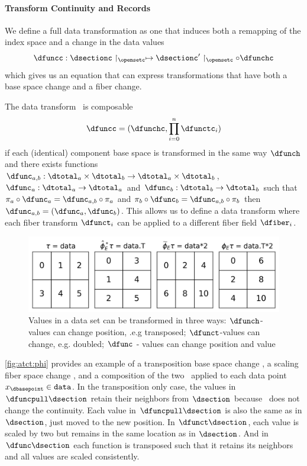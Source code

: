 \documentclass[10pt,journal,compsoc]{IEEEtran}
\theoremstyle{definition}
\theoremstyle{remark}
\begin{document}
\paragraph{Transform Continuity and Records}

We define a full data transformation as one that induces both a remapping of the index space and a change in the data values
\begin{equation}
  \label{eq:atct:morphism:all}
  \dfuncc: \dsectionc\restriction_{\opensetc} \mapsto \dsectionc^{\prime}\restriction_{\opensetc} \circ \dfunchc
\end{equation}
which gives us an equation that can express transformations that have both a base space change and a fiber change. 

The data transform \dfunc\ is composable 
\begin{equation}
  \dfuncc = (\dfunchc, \prod\limits_{i=0}^{n}\dfunctc_i)
\end{equation}
if each (identical) component base space is transformed in the same way $\dfunch$ and there exists functions $\dfunc_{a,b}: \dtotal_a \times \dtotal_b \rightarrow \dtotal_a \times \dtotal_b$, $\dfunc_{a}: \dtotal_a \rightarrow \dtotal_a$ and $\dfunc_{b}: \dtotal_b \rightarrow \dtotal_b$ such that $\pi_a \circ \dfunc_a = \dfunc_{a,b} \circ \pi_a$ and $\pi_b \circ \dfunc_b = \dfunc_{a,b} \circ \pi_b$ then $\dfunc_{a,b} = (\dfunc_a, \dfunc_b)$. This allows us to define a data transform where each fiber transform $\dfunct_{i}$ can be applied to a different fiber field $\dfiber_i$. 

\begin{figure}[h!]
  \includegraphics[width=\columnwidth]{phi.png}
  \caption{Values in a data set can be transformed in three ways: $\dfunch$-values can change position, .e.g transposed;  $\dfunct$-values can change, e.g. doubled; $\dfunc$ - values can change position and value  \label{fig:atct:phi}}
\end{figure}
\autoref{fig:atct:phi} provides an example of a transposition base space change \dfunch, a scaling fiber space change \dfunct, and a composition of the two \dfunc\ applied to each data point $x_{\dbasepoint} \in \texttt{data}$. In the transposition only case, the values in $\dfuncpull\dsection$ retain their neighbors from $\dsection$ because \dfunc\ does not change the continuity. Each value in $\dfuncpull\dsection$ is also the same as in $\dsection$, just moved to the new position. In $\dfunct\dsection$, each value is scaled by two but remains in the same location as in $\dsection$. And in $\dfunc\dsection$ each function is transposed such that it retains its neighbors and all values are scaled consistently.
\end{document}
